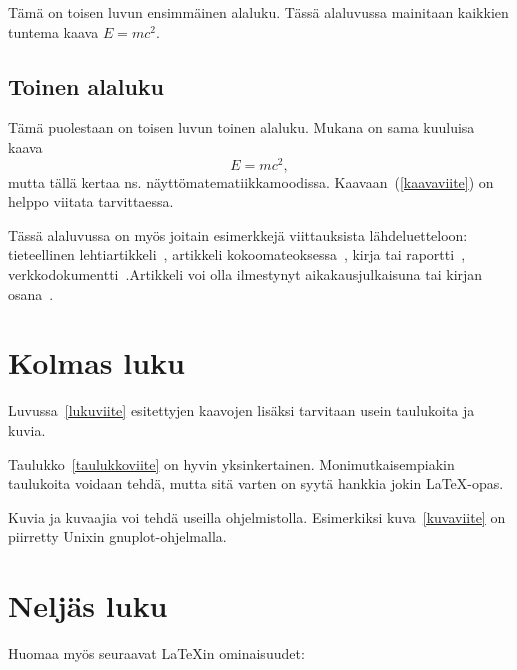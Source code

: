\documentclass[utf8,bachelor,manualbib]{gradu3}
\begin{document}
Tämä on toisen luvun ensimmäinen alaluku. Tässä alaluvussa mainitaan kaikkien
tuntema kaava $E=mc^2$.

\section{Toinen alaluku}

Tämä puolestaan on toisen luvun toinen alaluku. Mukana on sama kuuluisa kaava
\begin{equation}
  E = m c^2 , \label{kaavaviite}
\end{equation}
mutta tällä kertaa ns. näyttömatematiikkamoodissa. Kaavaan~(\ref{kaavaviite})
on helppo viitata tarvittaessa.

Tässä alaluvussa on myös joitain esimerkkejä viittauksista lähdeluetteloon:
tieteellinen lehtiartikkeli~\cite{kirj2001},
artikkeli kokoomateoksessa~\cite[luku~3]{kirjtoin2002},
kirja tai raportti~\cite[s.~13--15]{kirjtoinkolm2003},
verkkodokumentti~\cite{teki2004}.Artikkeli voi olla ilmestynyt aikakausjulkaisuna tai kirjan osana~\cite{kirj2001,kirjtoin2002}.


\chapter{Kolmas luku}

Luvussa~\ref{lukuviite} esitettyjen kaavojen lisäksi tarvitaan usein
taulukoita ja kuvia.

Taulukko~\ref{taulukkoviite} on hyvin yksinkertainen. Monimutkaisempiakin
taulukoita voidaan tehdä, mutta sitä varten on syytä hankkia jokin
\LaTeX{}-opas.

Kuvia ja kuvaajia voi tehdä useilla ohjelmistolla. Esimerkiksi
kuva~\ref{kuvaviite} on piirretty Unixin gnuplot-ohjelmalla. 

\chapter{Neljäs luku}


Huomaa myös seuraavat \LaTeX{}in ominaisuudet:
\end{document}
